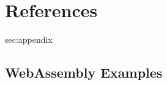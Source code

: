 \documentclass[a4paper]{article}
\begin{document}
\section{References}
\label{sec:references}
\begingroup
\renewcommand{\section}[2]{}%

{}
\endgroup

\newpage
\section{Appendix}
\label{sec:appendix}

\subsection{WebAssembly Examples}
\label{sec:appendix:wasm-examples}
\end{document}
